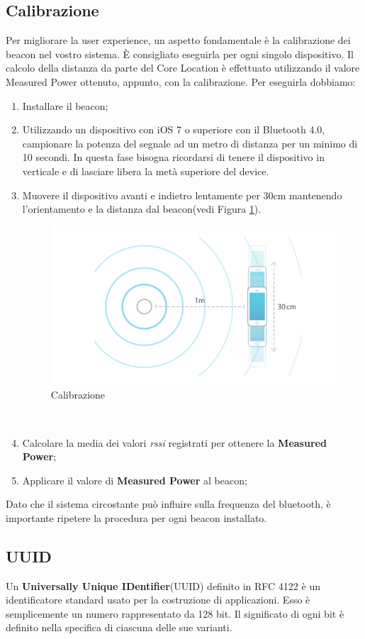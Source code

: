 \subsection{Calibrazione}
Per migliorare la user experience, un aspetto fondamentale è la calibrazione dei beacon nel vostro sistema.
È consigliato eseguirla per ogni singolo dispositivo.
Il calcolo della distanza da parte del Core Location è effettuato utilizzando il valore Measured Power ottenuto, appunto, con la calibrazione. 
Per eseguirla dobbiamo:
\begin{enumerate}
\item Installare il beacon;
\item Utilizzando un dispositivo con iOS 7 o superiore con il Bluetooth 4.0, campionare la potenza del segnale ad un metro di distanza per un minimo di 10 secondi. In questa fase bisogna ricordarsi di tenere il dispositivo  in verticale e di lasciare libera la metà superiore del device.
\item Muovere il dispositivo avanti e indietro lentamente per 30cm mantenendo l'orientamento e la distanza dal beacon(vedi Figura \ref{fig:calibrazione}). 
\begin{figure}[htbp]
\centering
\includegraphics[scale=0.6]{Immagini/fig5.png}
\caption{Calibrazione} 
\label{fig:calibrazione}
\end{figure}\\
\item Calcolare la media dei valori \textit{rssi} registrati per ottenere la \textbf{Measured Power};
\item Applicare il valore di \textbf{Measured Power} al beacon;
\end{enumerate}
Dato che il sistema circostante può influire sulla frequenza del bluetooth, è importante ripetere la procedura per ogni beacon installato. 
\subsection{UUID}
Un \textbf{Universally Unique IDentifier}(UUID) definito in RFC 4122\cite{RFC4122} è un identificatore standard usato per la costruzione di applicazioni.
Esso è semplicemente un numero rappresentato da 128 bit.
Il significato di ogni bit è definito nella specifica di ciascuna delle sue varianti.

